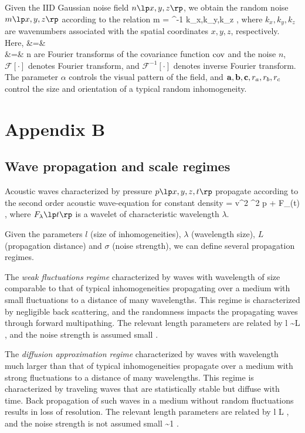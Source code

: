 Given the IID Gaussian noise field $n\ofxyz$, we obtain the random
noise $m\ofxyz$ according to the relation
%
\beq
m \ofxyz =
^{-1}
\lb {} \;
           \lp k_x,k_y,k_z \rp 
\rb\;,
\eeq
%
where $k_x,k_y,k_z$ are wavenumbers associated with the spatial
coordinates $x,y,z$, respectively. Here,
%
\beqa
\widehat{\cov} &=&  \lb \cov \rb
\\
    &=&  \lb n \rb
\eeqa
%
are Fourier transforms of the covariance function $\mathrm{cov}$ and the noise
$n$, $\mathscr{F}[\cdot]$ denotes Fourier transform, and
$\mathscr{F}^{-1}[\cdot]$ denotes inverse Fourier transform. The
parameter $\alpha$ controls the visual pattern of the field, and
${\bf a},{\bf b},{\bf c}, r_a,r_b,r_c$ control the size and orientation of a
typical random inhomogeneity.

\appendix
\section{Appendix B}
\subsection{Wave propagation and scale regimes}

Acoustic waves characterized by pressure $p \lp x,y,z,t \rp$
propagate according to the second order acoustic wave-equation 
for constant density
%
\beqa
{} = v^2 \nabla^2 p + F_{\lambda}(t) \;,
\eeqa
%
where $F_{\lambda}\lp t \rp$ is a wavelet of characteristic wavelength
$\lambda$.

Given the parameters $l$ (size of inhomogeneities), $\lambda$
(wavelength size), $L$ (propagation distance) and $\sigma$ (noise
strength), we can define several propagation regimes.

The {\it weak fluctuations regime} characterized by waves with
wavelength of size comparable to that of typical inhomogeneities
propagating over a medium with small fluctuations to a distance of
many wavelengths. This regime is characterized by negligible back
scattering, and the randomness impacts the propagating waves through
forward multipathing. The relevant length parameters are related by
%
\beq
l \sim \lambda \ll L \;,
\eeq
%
and the noise strength is assumed small
%
\beq
\sigma {} \;.
\eeq

The {\it diffusion approximation regime} characterized by waves with
wavelength much larger than that of typical inhomogeneities propagate
over a medium with strong fluctuations to a distance of many
wavelengths. This regime is characterized by traveling waves that are
statistically stable but diffuse with time. Back propagation of such
waves in a medium without random fluctuations results in loss of
resolution. The relevant length parameters are related by
%
\beq
l \ll \lambda \ll L \;,
\eeq
%
and the noise strength is not assumed small
%
\beq
\sigma \sim 1 \;.
\eeq

